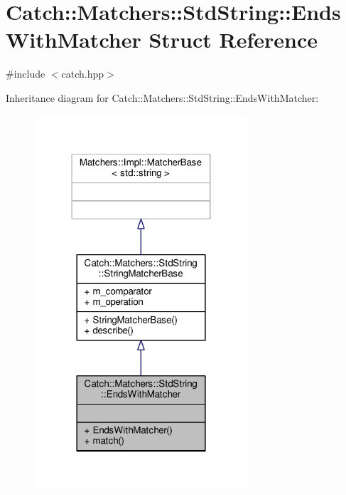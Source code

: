 \hypertarget{struct_catch_1_1_matchers_1_1_std_string_1_1_ends_with_matcher}{\section{Catch\-:\-:Matchers\-:\-:Std\-String\-:\-:Ends\-With\-Matcher Struct Reference}
\label{struct_catch_1_1_matchers_1_1_std_string_1_1_ends_with_matcher}
}


{\ttfamily \#include $<$catch.\-hpp$>$}



Inheritance diagram for Catch\-:\-:Matchers\-:\-:Std\-String\-:\-:Ends\-With\-Matcher\-:
\nopagebreak
\begin{figure}[H]
\begin{center}
\leavevmode
\includegraphics[width=226pt]{struct_catch_1_1_matchers_1_1_std_string_1_1_ends_with_matcher__inherit__graph}
\end{center}
\end{figure}


